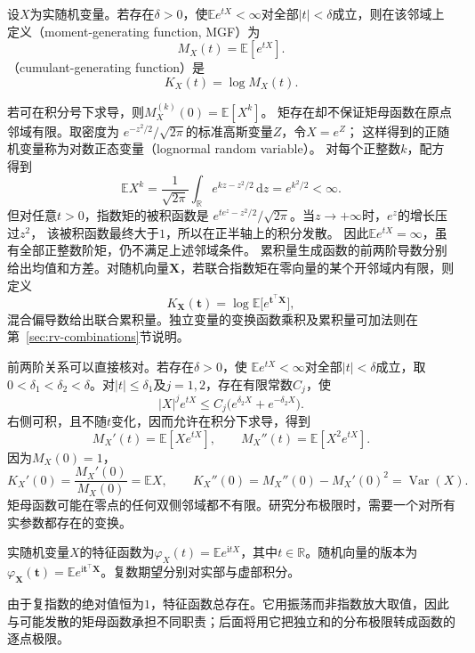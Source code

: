 \begin{definition}[矩母函数与累积量生成函数]
  \label{def:probability-moment-generating-functions}
设\(X\)为实随机变量。若存在\(\delta>0\)，使\(\mathbb E e^{tX}<\infty\)对全部\(|t|<\delta\)成立，则在该邻域上定义（moment-generating function, MGF）为
\[ M_X(t)=\mathbb{E}[e^{tX}]. \]
（cumulant-generating function）是
\[ K_X(t)=\log M_X(t). \]
\end{definition}
若可在积分号下求导，则\(M_X^{(k)}(0)=\mathbb{E}[X^k]\)。
矩存在却不保证矩母函数在原点邻域有限。取密度为
\(e^{-z^2/2}/\sqrt{2\pi}\)的标准高斯变量\(Z\)，令\(X=e^Z\)；
这样得到的正随机变量称为对数正态变量（lognormal random variable）。
对每个正整数\(k\)，配方得到
\[
 \mathbb E X^k
 =\frac1{\sqrt{2\pi}}\int_{\mathbb R}e^{kz-z^2/2}\,\mathrm dz
 =e^{k^2/2}<\infty.
\]
但对任意\(t>0\)，指数矩的被积函数是
\(e^{te^z-z^2/2}/\sqrt{2\pi}\)。当\(z\to+\infty\)时，\(e^z\)的增长压过\(z^2\)，
该被积函数最终大于\(1\)，所以在正半轴上的积分发散。
因此\(\mathbb E e^{tX}=\infty\)，虽有全部正整数阶矩，仍不满足上述邻域条件。
累积量生成函数的前两阶导数分别给出均值和方差。对随机向量\(\bm{X}\)，若联合指数矩在零向量的某个开邻域内有限，则定义
\[ K_{\bm{X}}(\bm{t})
  =\log\mathbb{E}\bigl[e^{\bm{t}^{\top}\bm{X}}\bigr], \]
混合偏导数给出联合累积量。独立变量的变换函数乘积及累积量可加法则在第~\ref{sec:rv-combinations}节说明。

前两阶关系可以直接核对。若存在\(\delta>0\)，使
\(\mathbb E e^{tX}<\infty\)对全部\(|t|<\delta\)成立，取\(0<\delta_1<\delta_2<\delta\)。对\(|t|\leq\delta_1\)及\(j=1,2\)，存在有限常数\(C_j\)，使
\[ |X|^j e^{tX}\leq C_j\bigl(e^{\delta_2X}+e^{-\delta_2X}\bigr). \]
右侧可积，且不随\(t\)变化，因而允许在积分下求导，得到
\[
  M_X'(t)=\mathbb{E}[Xe^{tX}],\qquad
  M_X''(t)=\mathbb{E}[X^2e^{tX}].
\]
因为\(M_X(0)=1\)，
\[
  K_X'(0)=\frac{M_X'(0)}{M_X(0)}=\mathbb{E}X,
  \qquad
  K_X''(0)
  =M_X''(0)-M_X'(0)^2
  =\operatorname{Var}(X).
\]
矩母函数可能在零点的任何双侧邻域都不有限。研究分布极限时，需要一个对所有实参数都存在的变换。
\begin{definition}[特征函数]
  \label{def:probability-characteristic-function}
实随机变量\(X\)的特征函数为\(\varphi_X(t)=\mathbb E e^{\mathrm i tX}\)，其中\(t\in\mathbb R\)。随机向量的版本为\(\varphi_{\bm X}(\bm t)=\mathbb E e^{\mathrm i\bm t^\top\bm X}\)。复数期望分别对实部与虚部积分。
\end{definition}
由于复指数的绝对值恒为\(1\)，特征函数总存在。它用振荡而非指数放大取值，因此与可能发散的矩母函数承担不同职责；后面将用它把独立和的分布极限转成函数的逐点极限。

